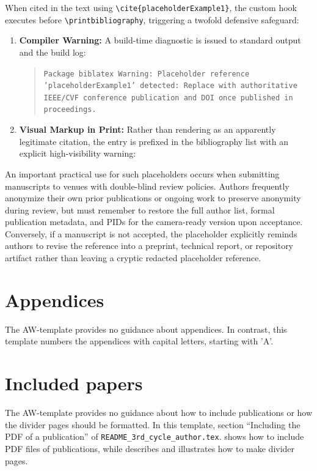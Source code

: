 \documentclass[12pt, twoside]{article}
\begin{document}
When cited in the text using \texttt{\textbackslash cite\{placeholderExample1\}}, the custom hook executes before \texttt{\textbackslash printbibliography}, triggering a twofold defensive safeguard:
\begin{enumerate}
    \item \textbf{Compiler Warning:} A build-time diagnostic is issued to standard output and the build log:
    \begin{quote}
    \texttt{Package biblatex Warning: Placeholder reference 'placeholderExample1' detected: Replace with authoritative IEEE/CVF conference publication and DOI once published in proceedings.}
    \end{quote}
    
    \item \textbf{Visual Markup in Print:} Rather than rendering as an apparently legitimate citation, the entry is prefixed in the bibliography list with an explicit high-visibility warning:
    \begin{quote}
    \end{quote}
\end{enumerate}

An important practical use for such placeholders occurs when submitting manuscripts to venues with double-blind review policies. Authors frequently anonymize their own prior publications or ongoing work to preserve anonymity during review, but must remember to restore the full author list, formal publication metadata, and \glspl{PID} for the camera-ready version upon acceptance. Conversely, if a manuscript is not accepted, the placeholder explicitly reminds authors to revise the reference into a preprint, technical report, or repository artifact rather than leaving a cryptic redacted placeholder reference.


\section{Appendices}
\label{sec:cycle3Appendices}
The AW-template provides no guidance about appendices. In contrast, this template numbers the appendices with capital letters, starting with 'A'.

\section{Included papers}
\label{sec:cycle3IncludedPapers}
The AW-template provides no guidance about how to include publications or how the divider pages should be formatted. In this template, section \enquote{Including the PDF of a publication} of \texttt{README\_3rd\_cycle\_author.tex}. shows how to include PDF files of publications, while  describes and illustrates how to make divider pages.
\end{document}
